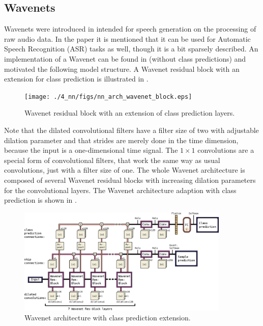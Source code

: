 \subsection{Wavenets}\label{sec:nn_arch_wavenet}
Wavenets were introduced in \cite{Oord2016} intended for speech generation on the processing of raw audio data.
In the paper it is mentioned that it can be used for Automatic Speech Recognition (ASR) tasks as well, though it is a bit sparsely described.
An implementation of a Wavenet can be found in \cite{Herrmann2018} (without class predictions) and motivated the following model structure.
A Wavenet residual block with an extension for class prediction is illustrated in .
\begin{figure}[!ht]
  \centering
    \texttt{[image: ./4\_nn/figs/nn\_arch\_wavenet\_block.eps]}
  \caption{Wavenet residual block \cite{Oord2016} with an extension of class prediction layers.}
  \label{fig:nn_arch_wavenet_block}
\end{figure}
\FloatBarrier
\noindent
Note that the dilated convolutional filters have a filter size of two with adjustable dilation parameter and that strides are merely done in the time dimension, because the input is a one-dimensional time signal.
The $1 \times 1$ convolutions are a special form of convolutional filters, that work the same way as usual convolutions, just with a filter size of one. 
The whole Wavenet architecture is composed of several Wavenet residual blocks with increasing dilation parameters for the convolutional layers.
The Wavenet architecture adaption with class prediction is shown in .
\begin{figure}[!ht]
  \centering
    \includegraphics[width=0.9\textwidth]{./4_nn/figs/nn_arch_wavenet_all.eps}
  \caption{Wavenet architecture with class prediction extension.}
  \label{fig:nn_arch_wavenet_all}
\end{figure}
\FloatBarrier
\noindent

